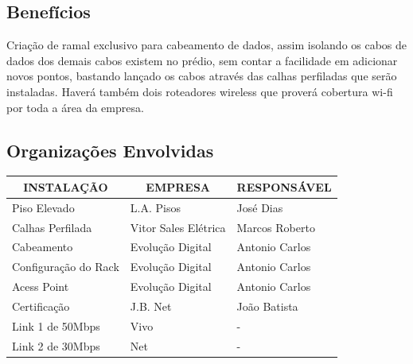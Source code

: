 \documentclass[	DIV=calc,%
							paper=a4,%
							fontsize=12pt,%
							onecolumn]{scrartcl}	 					%
\begin{document}
\subsection{Benefícios}
Criação de ramal exclusivo para cabeamento de dados, assim isolando os cabos de dados dos demais cabos existem no prédio, sem contar a facilidade em adicionar novos pontos, bastando lançado os cabos através das calhas perfiladas que serão instaladas. Haverá também dois roteadores wireless que proverá cobertura wi-fi por toda a área da empresa.

\subsection{Organizações Envolvidas}

\begin{table}[h!] %
	\centering
	\label{my-label}
	\begin{tabular}{|l|l|l|}
		\hline
		\multicolumn{1}{|c|}{\textbf{INSTALAÇÃO}} & \multicolumn{1}{c|}{\textbf{EMPRESA}} & \multicolumn{1}{c|}{\textbf{RESPONSÁVEL}} \\ \hline
		Piso Elevado                              & L.A. Pisos                             & José Dias                                  \\ \hline
		Calhas Perfilada                              & Vitor Sales Elétrica                   & Marcos Roberto                             \\ \hline
		Cabeamento                                & Evolução Digital                       & Antonio Carlos                             \\ \hline
		Configuração do Rack                      & Evolução Digital                       & Antonio Carlos                             \\ \hline
		Acess Point                      & Evolução Digital                       & Antonio Carlos                             \\ \hline		
		Certificação                              & J.B. Net                               & João Batista                               \\ \hline
		Link 1 de 50Mbps                              & Vivo                               & -                                      \\ \hline
		Link 2 de 30Mbps                              & Net                              & -                               \\ \hline				
	\end{tabular}
\end{table}
\end{document}
